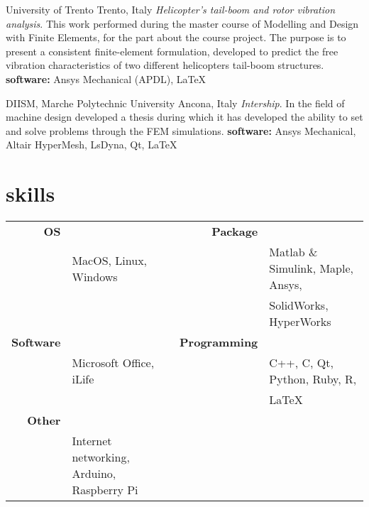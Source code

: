 \documentclass[a4,oneside]{friggeri-cv} %
\begin{document}
\begin{entrylist}     
    {University of Trento}
    {Trento, Italy}
    {\emph{Helicopter's tail-boom and rotor vibration analysis}.}
    {This work performed during the master course of Modelling and Design with Finite
    Elements, for the part about the course project.
    The purpose is to present a consistent finite-element
    formulation, developed to predict the free vibration characteristics of two
    different helicopters tail-boom structures.}
    {\textbf{software: } Ansys Mechanical (APDL), \LaTeX}
    {\href{https://github.com/frank1789/FEM-Analysis---Helicopter-s-Tail}{\faGithub}}
      
      
    {DIISM, Marche Polytechnic University}
    {Ancona, Italy}
    {\emph{Intership}.}
    {In the field of machine design developed a thesis during which it has developed the ability to set and solve problems through the FEM simulations.}
    {\textbf{software: } Ansys Mechanical, Altair  HyperMesh, LsDyna, Qt, \LaTeX}
    {\href{https://github.com/frank1789/LsDynaToAPDL}{\faGithub}}
      
    
  \end{entrylist}

\section{skills}

\begin{tabular}{rlrl}
\textbf{OS} && \textbf{Package}\\
& MacOS, Linux, Windows  &&  Matlab \& Simulink, Maple, Ansys,\\ &&& SolidWorks, HyperWorks \\
\textbf{Software} && \textbf{Programming}\\
&Microsoft Office, iLife &&  C++,  C, Qt, Python, Ruby, R, \\ &&&\LaTeX{} \\
\textbf{Other}\\
&Internet networking, Arduino, Raspberry Pi\\
\end{tabular}\\
\end{document}
